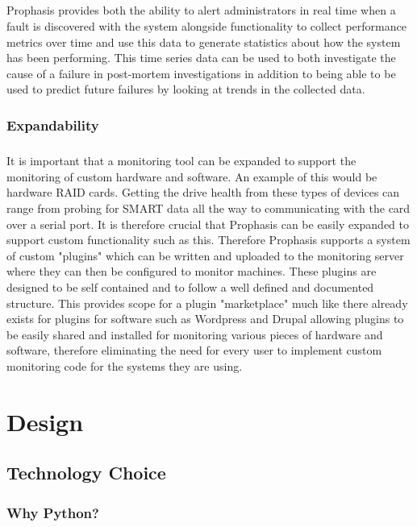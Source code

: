 \documentclass[bsc,logo,twoside]{infthesis}
\begin{document}
\paragraph*{}
	Prophasis provides both the ability to alert administrators in real time when
	a fault is discovered with the system alongside functionality to collect
	performance metrics over time and use this data to generate statistics about
	how the system has been performing.  This time series data can be used to both
	investigate the cause of a failure in post-mortem investigations in addition
	to being able to be used to predict future failures by looking at trends in
	the collected data.
	
\subsection{Expandability}
\paragraph*{}
	It is important that a monitoring tool can be expanded to support the
	monitoring of custom hardware and software.  An example of this would be
	hardware RAID cards.  Getting the drive health from these types of devices
	can range from probing for SMART data all the way to communicating with the
	card over a serial port.  It is therefore crucial that Prophasis can be
	easily expanded to support custom functionality such as this. Therefore 
	Prophasis supports a system of custom "plugins" which can be written and
	uploaded to the monitoring server where they can then be configured to monitor
	machines. These plugins are designed to be self contained and to follow a well
	defined and documented structure.  This provides scope for a plugin
	"marketplace" much like there already exists for plugins for software such as
	Wordpress and Drupal allowing plugins to be easily shared and installed for
	monitoring various pieces of hardware and software, therefore eliminating the
	need for every user to implement custom monitoring code for the systems they
	are using.
	
\chapter{Design}
\section{Technology Choice}
\subsection{Why Python?}
\end{document}
